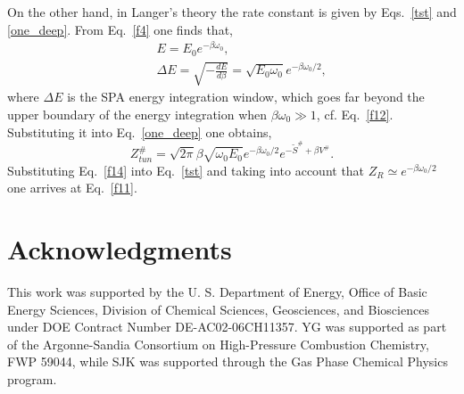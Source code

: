 \documentclass[journal=jpcafh,manuscript=article]{achemso}
\begin{document}
On the other hand, in Langer's theory the rate constant is given by
Eqs.~\ref{tst} and \ref{one_deep}. From Eq.~\ref{f4} one finds that,
\begin{eqnarray}
  \label{f12}
  &&E=E_0e^{-\beta\omega_0},
  \\
  \label{f13}
  &&\Delta E= \sqrt{-\frac{dE}{d\beta}}=\sqrt{E_0\omega_0}e^{-\beta\omega_0/2},
\end{eqnarray}
where $\Delta E$ is the SPA energy integration window, which goes far beyond the
upper boundary of the energy integration when $\beta\omega_0\gg1$, cf. Eq.~\ref{f12}.
Substituting it into Eq.~\ref{one_deep} one obtains,
\begin{equation}
  \label{f14}
  Z^\#_{tun}=\sqrt{2\pi}\beta\sqrt{\omega_0E_0}e^{-\beta\omega_0/2}
  e^{-\tilde{S}^\#+\beta V^\#}.
\end{equation}
Substituting Eq.~\ref{f14} into Eq.~\ref{tst} and taking into account
that $Z_R\simeq e^{-\beta\omega_0/2}$ one arrives at Eq.~\ref{f11}.

\section*{Acknowledgments} %
This work was supported by the U. S. Department of Energy, Office of
Basic Energy Sciences, Division of Chemical Sciences, Geosciences, and
Biosciences under DOE Contract Number DE-AC02-06CH11357. YG was
supported as part of the Argonne-Sandia Consortium on High-Pressure
Combustion Chemistry, FWP 59044, while SJK was supported through the
Gas Phase Chemical Physics program.

%
 
\end{document}
